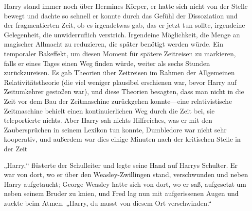 Harry stand immer noch über Hermines Körper, er hatte sich nicht von der Stelle bewegt und dachte so schnell er konnte durch das Gefühl der Dissoziation und der fragmentierten Zeit, ob es irgendetwas gab, das er jetzt tun sollte, irgendeine Gelegenheit, die unwiderruflich verstrich. Irgendeine Möglichkeit, die Menge an magischer Allmacht zu reduzieren, die später benötigt werden würde. Ein temporaler Bakeffekt, um diesen Moment für spätere Zeitreisen zu markieren, falls er eines Tages einen Weg finden würde, weiter als sechs Stunden zurückzureisen. Es gab Theorien über Zeitreisen im Rahmen der Allgemeinen Relativitätstheorie (die viel weniger plausibel erschienen war, bevor Harry auf Zeitumkehrer gestoßen war), und diese Theorien besagten, dass man nicht in die Zeit vor dem Bau der Zeitmaschine zurückgehen konnte—eine relativistische Zeitmaschine behielt einen kontinuierlichen Weg durch die Zeit bei, sie teleportierte nichts. Aber Harry sah nichts Hilfreiches, was er mit den Zaubersprüchen in seinem Lexikon tun konnte, Dumbledore war nicht sehr kooperativ, und außerdem war dies einige Minuten nach der kritischen Stelle in der Zeit

„Harry,“ flüsterte der Schulleiter und legte seine Hand auf Harrys Schulter. Er war von dort, wo er über den Weasley-Zwillingen stand, verschwunden und neben Harry aufgetaucht; George Weasley hatte sich von dort, wo er saß, aufgesetzt um neben seinem Bruder zu knien, und Fred lag nun mit aufgerissenen Augen und zuckte beim Atmen. „Harry, du musst von diesem Ort verschwinden.“

